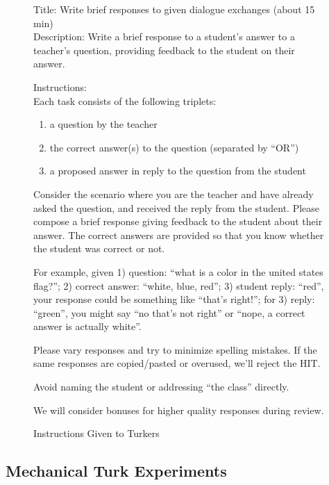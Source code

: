 \begin{figure}[!ht]

Title: Write brief responses to given dialogue exchanges (about 15 min)\\

Description: Write a brief response to a student's answer to a teacher's question, providing feedback to the student on their answer.

Instructions:\\

Each task consists of the following triplets:
\begin{enumerate}
\item a question by the teacher

\item the correct answer(s) to the question (separated by ``OR'')

\item a proposed answer in reply to the question from the student

\end{enumerate}

Consider the scenario where you are the teacher and have already asked the question, and received the reply from the student. Please compose a brief response giving feedback to the student about their answer. The correct answers are provided so that you know whether the student was correct or not.

For example, given 1) question: ``what is a color in the united states flag?''; 2) correct answer: ``white, blue, red''; 3) student reply: ``red'', your response could be something like ``that's right!''; for 3) reply: ``green'', you might say ``no that's not right'' or ``nope, a correct answer is actually white''.

Please vary responses and try to minimize spelling mistakes. If the same responses are copied/pasted or overused, we'll reject the HIT.

Avoid naming the student or addressing ``the class'' directly.

We will consider bonuses for higher quality responses during review.
\caption{Instructions Given to Turkers}
\label{insTurk}
\end{figure}


\subsection{Mechanical Turk Experiments} \label{sec:data-mturk}

